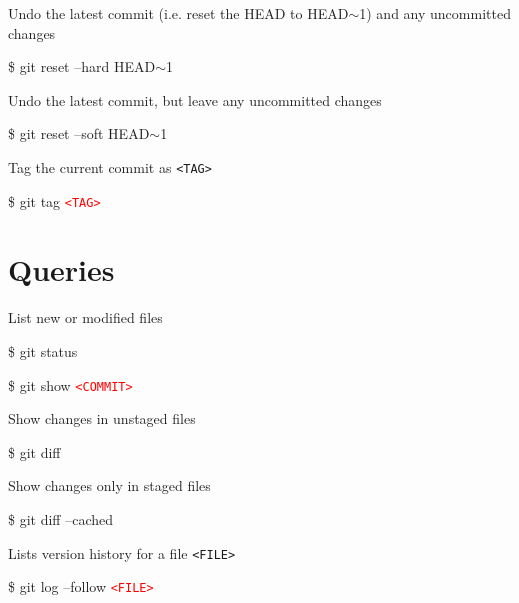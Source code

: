 \documentclass[10pt,a4paper]{article}
\newenvironment{cheatentry}{%
    \noindent%
    \begin{minipage}{\columnwidth}%
    \small%
    \noindent%
}{%
    \end{minipage}%
}
\newenvironment{cheatcmde}{%
    \noindent%
    \begin{cmdbox}%
    \begin{flushleft}%
    \bgroup%
    \setlength{\parindent}{-12pt}%
    \ttfamily\fontseries{b}\selectfont\large%
    \hspace{\parindent}%
}{%
    \egroup%
    \end{flushleft}%
    \end{cmdbox}%
}
\newcommand{\entrysep}{\vspace{1em}}
\newcommand{\cheatcmd}[1]{%
    \begin{cheatcmde}#1\end{cheatcmde}
}
\newcommand{\cheatmetavar}[1]{%
    \textcolor{red}{\texttt{\textless{}#1\textgreater{}}}%
}
\newcommand{\cheatmetavarref}[1]{%
    {\texttt{\textless{}#1\textgreater{}}}%
}
\newcommand{\HEADP}[1][]{HEAD$\sim$#1}
\begin{document}
\begin{multicols}{4}
\entrysep{}%

\begin{cheatentry}%
Undo the latest commit (i.e. reset the HEAD to HEAD$\sim$1) and any uncommitted changes
\cheatcmd{\$ git reset --hard \HEADP[1]}
\end{cheatentry}

\entrysep{}%

\begin{cheatentry}%
Undo the latest commit, but leave any uncommitted changes
\cheatcmd{\$ git reset --soft \HEADP[1]}
\end{cheatentry}

\entrysep{}%

\begin{cheatentry}%
Tag the current commit as \cheatmetavarref{TAG}
\cheatcmd{\$ git tag \cheatmetavar{TAG}}
\end{cheatentry}

\section{Queries}

\begin{cheatentry}%
List new or modified files
\cheatcmd{\$ git status}
\end{cheatentry}

\entrysep{}%

\begin{cheatentry}%

\cheatcmd{\$ git show \cheatmetavar{COMMIT}}
\end{cheatentry}

\entrysep{}%

\begin{cheatentry}%
Show changes in unstaged files
\cheatcmd{\$ git diff}
\end{cheatentry}

\entrysep{}%

\begin{cheatentry}%
Show changes only in staged files
\cheatcmd{\$ git diff --cached}
\end{cheatentry}

\entrysep{}%

\begin{cheatentry}%
Lists version history for a file \cheatmetavarref{FILE}
\cheatcmd{\$ git log --follow \cheatmetavar{FILE}}
\end{cheatentry}



\end{multicols}
\end{document}
